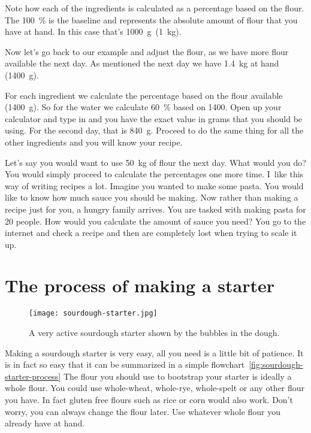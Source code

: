 Note how each of the ingredients is calculated as a percentage
based on the flour. The \qty{100}{\percent} is the baseline and represents the absolute
amount of flour that you have at hand. In this case that's
\qty{1000}{\gram}~(\qty{1}{\kg}).

Now let's go back to our example and adjust the flour, as we have
more flour available the next day. As mentioned the next day
we have \qty{1.4}{\kg} at hand (\qty{1400}{\gram}).

\begin{table}[!htb]
    \centering
        
        \caption[Another baker's math example]{An example recipe that uses
            \qty{1400}{\gram} as its baseline and is then calculated using
            baker's math.}
\end{table}

For each ingredient we calculate the percentage
based on the flour available (\qty{1400}{\gram}). So for the water
we calculate \qty{60}{\percent} based on \num{1400}. Open up your
calculator and type in  and you have
the exact value in grams that you should be using.
For the second day, that is \qty{840}{\gram}. Proceed to do the same
thing for all the other ingredients and you will know
your recipe.

Let's say you would want to use \qty{50}{\kg} of flour
the next day. What would you do? You would simply proceed
to calculate the percentages one more time. I~like this
way of writing recipes a lot. Imagine you wanted to make
some pasta. You would like to know how much sauce you should
be making. Now rather than making a recipe just for you, a
hungry family arrives. You are tasked with making pasta
for \num{20} people. How would you calculate the amount of sauce
you need? You go to the internet and check a recipe and then
are completely lost when trying to scale it up.

\section{The process of making a starter}

\begin{figure}[!htb]
  \texttt{[image: sourdough-starter.jpg]}
  \caption[Very active sourdough]{A very active sourdough starter shown by the
      bubbles in the dough.}%
  \label{fig:sourdough-starter}
\end{figure}

Making a sourdough starter is very easy, all you need
is a little bit of patience. It is in fact so easy that it can be summarized
in a simple flowchart~\ref{fig:sourdough-starter-process} The flour you should
use to bootstrap your starter is ideally a whole flour.
You could use whole-wheat, whole-rye, whole-spelt or
any other flour you have. In fact gluten free flours such
as rice or corn would also work. Don't worry, you can always
change the flour later. Use whatever whole flour you
already have at hand.

